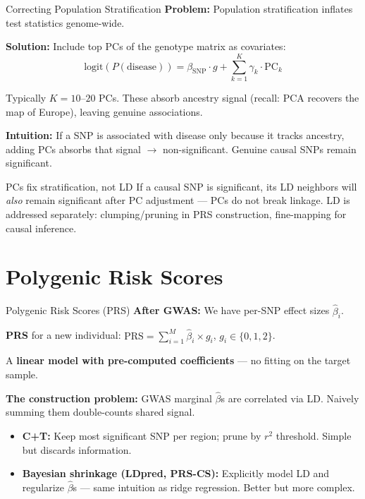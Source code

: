 \documentclass[aspectratio=169,10pt]{beamer}
\begin{document}
\begin{frame}{Correcting Population Stratification}
\textbf{Problem:} Population stratification inflates test statistics genome-wide.

\vspace{0.2em}
\textbf{Solution:} Include top PCs of the genotype matrix as covariates:
\[
\text{logit}(P(\text{disease})) = \beta_{\text{SNP}} \cdot g + \sum_{k=1}^{K} \gamma_k \cdot \text{PC}_k
\]

Typically $K = 10$--$20$ PCs. These absorb ancestry signal (recall: PCA recovers the map of Europe), leaving genuine associations.

\vspace{0.1em}
{\small \textbf{Intuition:} If a SNP is associated with disease only because it tracks ancestry, adding PCs absorbs that signal $\to$ non-significant. Genuine causal SNPs remain significant.}

\vspace{0.1em}
\begin{block}{PCs fix stratification, not LD}
{\small If a causal SNP is significant, its LD neighbors will \emph{also} remain significant after PC adjustment --- PCs do not break linkage. LD is addressed separately: clumping/pruning in PRS construction, fine-mapping for causal inference.}
\end{block}
\end{frame}


\section{Polygenic Risk Scores}

\begin{frame}{Polygenic Risk Scores (PRS)}
\textbf{After GWAS:} We have per-SNP effect sizes $\hat{\beta}_i$.

\vspace{0.2em}
\textbf{PRS} for a new individual: $\text{PRS} = \sum_{i=1}^{M} \hat{\beta}_i \times g_i$, \; $g_i \in \{0,1,2\}$.

\vspace{0.2em}
A \textbf{linear model with pre-computed coefficients} --- no fitting on the target sample.

\vspace{0.3em}
\textbf{The construction problem:} GWAS marginal $\hat{\beta}$s are correlated via LD. Naively summing them double-counts shared signal.
\begin{itemize}[<+->]\itemsep0.1em
    \item \textbf{C+T:} Keep most significant SNP per region; prune by $r^2$ threshold. Simple but discards information.
    \item \textbf{Bayesian shrinkage (LDpred, PRS-CS):} Explicitly model LD and regularize $\hat{\beta}$s --- same intuition as ridge regression. Better but more complex.
\end{itemize}
\end{frame}
\end{document}
